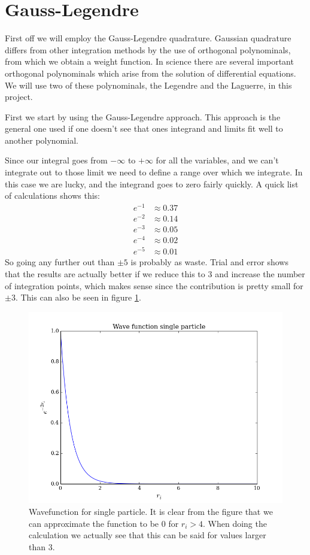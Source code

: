\documentclass{aa}   %
\begin{document}
\section{Gauss-Legendre}\label{sec:Gauss-Legendre}
First off we will employ the Gauss-Legendre quadrature. Gaussian quadrature differs from other integration methods by the use of orthogonal polynominals, from which we obtain a weight function. In science there are several important orthogonal polynominals which arise from the solution of differential equations. We will use two of these polynominals, the Legendre and the Laguerre, in this project. 

First we start by using the Gauss-Legendre approach. This approach is the general one used if one doesn't see that ones integrand and limits fit well to another polynomial. 

Since our integral goes from $-\infty$ to $+\infty$ for all the variables, and we can't integrate out to those limit we need to define a range over which we integrate. In this case we are lucky, and the integrand goes to zero fairly quickly.
A quick list of calculations shows this:
\begin{equation*}
\begin{aligned}
e^{-1} &\approx 0.37 \\ 
e^{-2} &\approx 0.14 \\
e^{-3} &\approx 0.05 \\
e^{-4} &\approx 0.02 \\
e^{-5} &\approx 0.01 
\end{aligned}
\end{equation*}
So going any further out than $\pm 5$ is probably as waste. Trial and error shows that the results are actually better if we reduce this to $3$ and increase the number of integration points, which makes sense since the contribution is pretty small for $\pm 3$. This can also be seen in figure \ref{exp}.

\begin{figure}
 \includegraphics[width=.49\textwidth]{exp.png}
\caption{Wavefunction for single particle. It is clear from the figure that we can approximate the function to be 0 for $r_i > 4$. When doing the calculation we actually see that this can be said for values larger than 3.}
\label{exp}
\end{figure}
\end{document}
